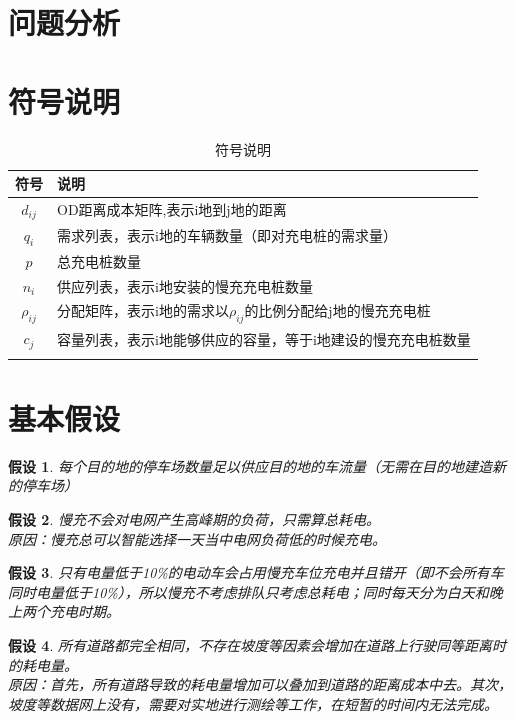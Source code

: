 \documentclass[12pt, a4paper, oneside]{ctexart}
\newtheorem{assumption}{假设}[section]
\begin{document}
\section{问题分析}

\section{符号说明}
\begin{table}[h]
    \caption{符号说明}
    \centering
    \renewcommand{\arraystretch}{2}
    \begin{tabular*}{\textwidth}{c||l}%
        \toprule[1.5mm]
        \Large{\textbf{符号}} & \Large{\textbf{说明}} \\
        \midrule[1.5pt]
        \(d_{ij}\) & OD距离成本矩阵,表示i地到j地的距离 \\\hline
        \(q_i\)&需求列表，表示i地的车辆数量（即对充电桩的需求量）\\\hline
        \(p\)&总充电桩数量\\\hline
        \(n_i\)&供应列表，表示i地安装的慢充充电桩数量\\\hline
        \(\rho_{ij}\)&分配矩阵，表示i地的需求以\(\rho_{ij}\)的比例分配给j地的慢充充电桩\\\hline
        \(c_j\)&容量列表，表示i地能够供应的容量，等于i地建设的慢充充电桩数量\\\hline
        &\\\hline
        \bottomrule[1mm]
    \end{tabular*}
\end{table}
\section{基本假设}
\begin{assumption}\label{asmp:lcpark}
    每个目的地的停车场数量足以供应目的地的车流量（无需在目的地建造新的停车场）
\end{assumption}
\begin{assumption}\label{asmp:lcload}
    慢充不会对电网产生高峰期的负荷，只需算总耗电。\\
    原因：慢充总可以智能选择一天当中电网负荷低的时候充电。
\end{assumption}
\begin{assumption}\label{asmp:lcoccupy}
    只有电量低于10\%的电动车会占用慢充车位充电并且错开（即不会所有车同时电量低于10\%），所以慢充不考虑排队只考虑总耗电；同时每天分为白天和晚上两个充电时期。
\end{assumption}
\begin{assumption}\label{asmp:cost}
    所有道路都完全相同，不存在坡度等因素会增加在道路上行驶同等距离时的耗电量。\\
    原因：首先，所有道路导致的耗电量增加可以叠加到道路的距离成本中去。其次，坡度等数据网上没有，需要对实地进行测绘等工作，在短暂的时间内无法完成。
\end{assumption}
\end{document}
